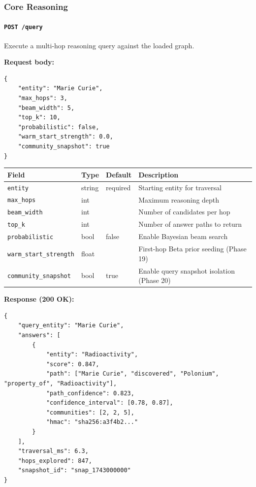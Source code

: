 \documentclass[11pt,article,oneside]{memoir}
\begin{document}
\subsubsection{Core Reasoning}

\paragraph{\texttt{POST /query}}
Execute a multi-hop reasoning query against the loaded graph.

\textbf{Request body:}
\begin{lstlisting}
{
    "entity": "Marie Curie",
    "max_hops": 3,
    "beam_width": 5,
    "top_k": 10,
    "probabilistic": false,
    "warm_start_strength": 0.0,
    "community_snapshot": true
}
\end{lstlisting}

\begin{center}
{\footnotesize
\begin{tabularx}{\columnwidth}{|>{\raggedright\arraybackslash}X|>{\raggedright\arraybackslash}X|>{\raggedright\arraybackslash}X|>{\raggedright\arraybackslash}X|}
\hline
Field & Type & Default & Description \\ \hline
\texttt{entity} & string & required & Starting entity for traversal \\ \hline
\texttt{max\_hops} & int & 3 & Maximum reasoning depth \\ \hline
\texttt{beam\_width} & int & 5 & Number of candidates per hop \\ \hline
\texttt{top\_k} & int & 10 & Number of answer paths to return \\ \hline
\texttt{probabilistic} & bool & false & Enable Bayesian beam search \\ \hline
\texttt{warm\_start\_strength} & float & 0.0 & First-hop Beta prior seeding (Phase 19) \\ \hline
\texttt{community\_snapshot} & bool & true & Enable query snapshot isolation (Phase 20) \\ \hline
\end{tabularx}
}
\end{center}

\textbf{Response (200 OK):}
\begin{lstlisting}
{
    "query_entity": "Marie Curie",
    "answers": [
        {
            "entity": "Radioactivity",
            "score": 0.847,
            "path": ["Marie Curie", "discovered", "Polonium", "property_of", "Radioactivity"],
            "path_confidence": 0.823,
            "confidence_interval": [0.78, 0.87],
            "communities": [2, 2, 5],
            "hmac": "sha256:a3f4b2..."
        }
    ],
    "traversal_ms": 6.3,
    "hops_explored": 847,
    "snapshot_id": "snap_1743000000"
}
\end{lstlisting}
\end{document}
